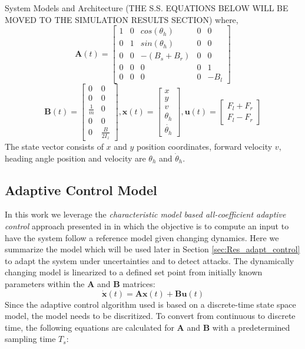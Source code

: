 \begin{section}{System Models and Architecture}
(THE S.S. EQUATIONS BELOW WILL BE MOVED TO THE SIMULATION RESULTS SECTION)
where,
    \begin{equation}
	\bm{A}(t)=\begin{bmatrix} 1 & 0 & cos(\theta_h) & 0 & 0 \\ 0 & 1 & sin(\theta_h) & 0 & 0 \\ 0 & 0 & -(B_s+B_r) & 0 & 0 \\ 0 & 0 & 0 & 0 & 1 \\  0 & 0 & 0 & 0 & -B_l \end{bmatrix} \nonumber
	\end{equation}
	\begin{equation}
	\bm{B}(t)=\begin{bmatrix} 0 & 0 \\ 0 & 0 \\ \frac{1}{m} & 0 \\ 0 & 0 \\  0 & \frac{B}{2I_z} \end{bmatrix}, \bm{x}(t)=\begin{bmatrix} x \\ y \\ v \\ \theta_h \\ \dot{\theta_h} \end{bmatrix}, \bm{u}(t)=\begin{bmatrix} F_l+F_r \\ F_l-F_r \end{bmatrix} \nonumber
	\end{equation}
The state vector consists of $x$ and $y$ position coordinates, forward velocity $v$, heading angle position and velocity are $\theta_h$ and $\dot{\theta}_h$.
	



\subsection{Adaptive Control Model}
In this work we leverage the \textit{characteristic model based all-coefficient adaptive control} approach presented in \cite{4106038} in which the objective is to compute an input to have the system follow a reference model given changing dynamics. Here we summarize the model which will be used later in Section  \ref{sec:Res_adapt_control} to adapt the system under uncertainties and to detect attacks. The dynamically changing model is linearized to a defined set point from initially known parameters within the $\bm{A}$ and $\bm{B}$ matrices:
	\begin{equation}
	\dot{\bm{x}}(t) = \bm{A}\bm{x}(t) + \bm{B}\bm{u}(t)
	\end{equation}
Since the adaptive control algorithm used is based on a discrete-time state space model, the model needs to be discritized. To convert from continuous to discrete time, the following equations are calculated for $\bm{A}$ and $\bm{B}$ with a predetermined sampling time $T_s$:


\end{section}
